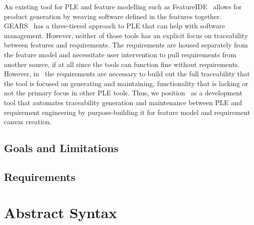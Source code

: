 An existing tool for PLE and feature modelling such as FeatureIDE~\cite{kastner2009featureide, thum2014featureide} allows for product generation by weaving software defined in the features together. GEARS~\cite{GEARS} has a three-tiered approach to PLE that can help with software management. However, neither of those tools has an explicit focus on traceability between features and requirements. The requirements are housed separately from the feature model and necessitate user intervention to pull requirements from another source, if at all since the tools can function fine without requirements. However, in \tool\ the requirements are necessary to build out the full traceability that the tool is focused on generating and maintaining, functionality that is lacking or not the primary focus in other PLE tools. Thus, we position \tool\ as a development tool that automates traceability generation and maintenance between PLE and requirement engineering by purpose-building it for feature model and requirement canvas creation.

\subsection{Goals and Limitations}

\subsection{Requirements}



\section{Abstract Syntax}

